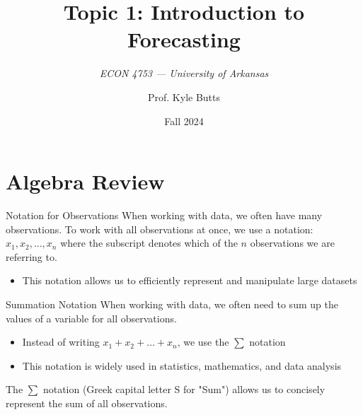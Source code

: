 \documentclass[aspectratio=169,t,11pt,table]{beamer}
\title{Topic 1: Introduction to Forecasting}
\subtitle{\it ECON 4753 — University of Arkansas}
\date{Fall 2024}
\author{Prof. Kyle Butts}
\begin{document}
\begin{frame}
  \maketitle

\end{frame}

\section{Algebra Review}

\begin{frame}{Notation for Observations}
  When working with data, we often have many observations. To work with all observations at once, we use a notation: 
  $x_1, x_2, \dots, x_n$
  where the subscript denotes which of the $n$ observations we are referring to.
  \begin{itemize}
    \item This notation allows us to efficiently represent and manipulate large datasets
  \end{itemize}
\end{frame}

\begin{frame}{Summation Notation}
  When working with data, we often need to sum up the values of a variable for all observations.
  \begin{itemize}
    \item Instead of writing $x_1 + x_2 + \dots + x_n$, we use the $\sum$ notation
    \item This notation is widely used in statistics, mathematics, and data analysis
  \end{itemize}
  
  \bigskip
  The $\sum$ notation (Greek capital letter S for "Sum") allows us to concisely represent the sum of all observations. 
\end{frame}
\end{document}

